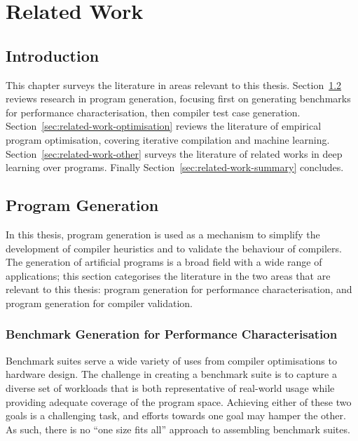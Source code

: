 \chapter{Related Work}
\label{chap:related-work}

\section{Introduction}

This chapter surveys the literature in areas relevant to this thesis. Section~\ref{sec:related-work-generation} reviews research in program generation, focusing first on generating benchmarks for performance characterisation, then compiler test case generation. Section~\ref{sec:related-work-optimisation} reviews the literature of empirical program optimisation, covering iterative compilation and machine learning. Section~\ref{sec:related-work-other} surveys the literature of related works in deep learning over programs. Finally Section~\ref{sec:related-work-summary} concludes.


\section{Program Generation}
\label{sec:related-work-generation}

In this thesis, program generation is used as a mechanism to simplify the development of compiler heuristics and to validate the behaviour of compilers. The generation of artificial programs is a broad field with a wide range of applications; this section categorises the literature in the two areas that are relevant to this thesis: program generation for performance characterisation, and program generation for compiler validation.

\subsection{Benchmark Generation for Performance Characterisation}

Benchmark suites serve a wide variety of uses from compiler optimisations to hardware design. The challenge in creating a benchmark suite is to capture a diverse set of workloads that is both representative of real-world usage while providing adequate coverage of the program space. Achieving either of these two goals is a challenging task, and efforts towards one goal may hamper the other. As such, there is no ``one size fits all'' approach to assembling benchmark suites.

